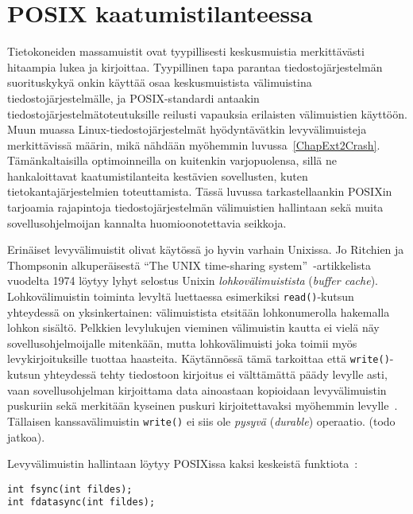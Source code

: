 \section{POSIX kaatumistilanteessa}
\label{ChapPosixDataConsistency}
Tietokoneiden massamuistit ovat tyypillisesti keskusmuistia merkittävästi hitaampia lukea ja kirjoittaa.
Tyypillinen tapa parantaa tiedostojärjestelmän suorituskykyä onkin käyttää osaa keskusmuistista välimuistina tiedostojärjestelmälle,
ja POSIX-standardi antaakin tiedostojärjestelmätoteutuksille reilusti vapauksia erilaisten välimuistien käyttöön.
Muun muassa Linux-tiedostojärjestelmät hyödyntävätkin levyvälimuisteja merkittävissä määrin,
mikä nähdään myöhemmin luvussa~\ref{ChapExt2Crash}.
Tämänkaltaisilla optimoinneilla on kuitenkin varjopuolensa,
sillä ne hankaloittavat kaatumistilanteita kestävien sovellusten, kuten tietokantajärjestelmien toteuttamista.
Tässä luvussa tarkastellaankin POSIXin tarjoamia rajapintoja tiedostojärjestelmän välimuistien hallintaan sekä muita sovellusohjelmoijan kannalta huomioonotettavia seikkoja.

Erinäiset levyvälimuistit olivat käytössä jo hyvin varhain Unixissa.
Jo Ritchien ja Thompsonin alkuperäisestä ``The UNIX time-sharing system''~\cite{UnixPaper}-artikkelista vuodelta 1974 löytyy lyhyt selostus Unixin \emph{lohkovälimuistista} (\emph{buffer cache}).
Lohkovälimuistin toiminta levyltä luettaessa esimerkiksi \texttt{read()}-kutsun yhteydessä on yksinkertainen:
välimuistista etsitään lohkonumerolla hakemalla lohkon sisältö.
Pelkkien levylukujen vieminen välimuistin kautta ei vielä näy sovellusohjelmoijalle mitenkään,
mutta lohkovälimuisti joka toimii myös levykirjoituksille tuottaa haasteita.
Käytännössä tämä tarkoittaa että \texttt{write()}-kutsun yhteydessä tehty tiedostoon kirjoitus ei välttämättä päädy levylle asti,
vaan sovellusohjelman kirjoittama data ainoastaan kopioidaan levyvälimuistin puskuriin sekä merkitään kyseinen puskuri kirjoitettavaksi myöhemmin levylle~\cite{UnixPaper}.
Tällaisen kanssavälimuistin \texttt{write()} ei siis ole \emph{pysyvä} (\emph{durable}) operaatio.
(todo jatkoa).

Levyvälimuistin hallintaan löytyy POSIXissa kaksi keskeistä funktiota~\cite{PosixSpec}:
\begin{verbatim}
int fsync(int fildes);
int fdatasync(int fildes);
\end{verbatim}

